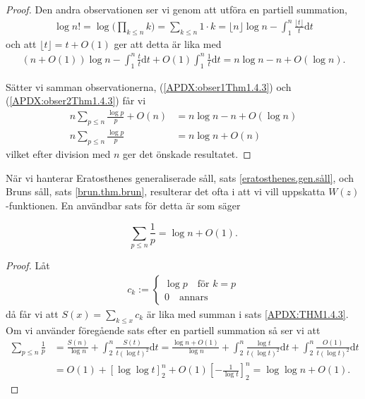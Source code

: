 \begin{proof}
Den andra observationen ser vi genom att utföra en partiell summation,
\begin{align*}
    \log n! = \log \Big(\prod_{k \leq n} k\Big) = \sum_{k \leq n} 1 \cdot k = 
    \lfloor n \rfloor \log n - \int_1^n \frac{\lfloor t \rfloor}{t} \text{d} t 
\end{align*}
och att \(\lfloor t \rfloor = t + O(1)\) ger att detta är lika med
\begin{align} \label{APDX:obser2Thm1.4.3}
    (n + O(1)) \log n - \int_1^n \frac{t}{t} \text{d} t + O(1) \int_1^n \frac{1}{t} \text{d} t  = n \log n - n + O(\log n).
\end{align}

Sätter vi samman observationerna, (\ref{APDX:obser1Thm1.4.3}) och (\ref{APDX:obser2Thm1.4.3}) får vi 
\begin{align*}
    n \sum_{p \leq n} \frac{\log p}{p} + O(n) &= n \log n - n + O(\log n) \\
    n \sum_{p \leq n} \frac{\log p}{p} &= n \log n + O(n)
\end{align*}
vilket efter division med $n$ ger det önskade resultatet.
\end{proof}

När vi hanterar Eratosthenes generaliserade såll, sats \ref{eratosthenes.gen.såll}, och Bruns såll, sats \ref{brun.thm.brun}, resulterar det ofta i att vi vill uppskatta \(W(z)\)-funktionen. En användbar sats för detta är \cite[Sats 1.4.4]{cojocarumurty} som säger
\begin{theorem} \label{APDX:THM1.4.4}
    \[\sum_{p \leq n} \frac{1}{p} = \log n + O(1).\]
\end{theorem}
\begin{proof}
Låt
\begin{align*}
    c_k := 
    \begin{cases}
    \log p \quad \text{för } k = p \\
    0 \quad \text{annars}
    \end{cases}
\end{align*}
då får vi att \(S(x) = \sum_{k \leq x} c_k\) är lika med summan i sats \ref{APDX:THM1.4.3}. Om vi använder föregående sats efter en partiell summation så ser vi att
\begin{align*}
    \sum_{p \leq n} \frac{1}{p} &= \frac{S(n)}{\log n} + \int_2^n \frac{S(t)}{t(\log t)^2} \text{d}t 
    = \frac{\log n + O(1)}{\log n} + \int_2^n \frac{\log t}{t(\log t)^2} \text{d}t + \int_2^n \frac{O(1)}{t(\log t)^2} \text{d}t \\
    &= O(1) + \left[\log \log t \right]_2^n + O(1) \left[- \frac{1}{\log t} \right]_2^n
    = \log \log n  + O(1).
\end{align*}

\end{proof}